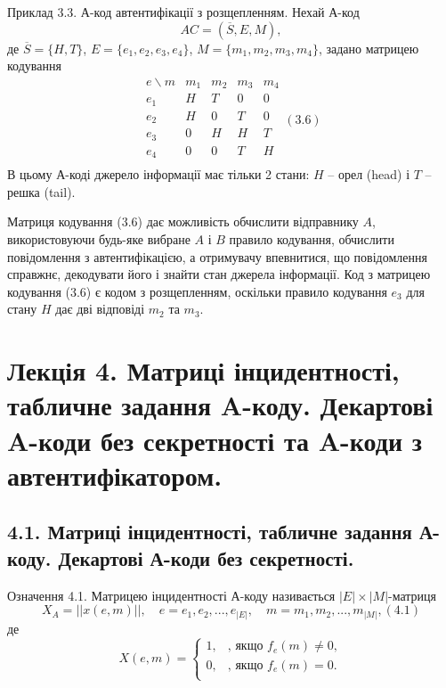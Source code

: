 \begin{example}
    Приклад 3.3. А-код автентифікації з розщепленням.
    Нехай А-код
    \begin{equation}
        AC = (\overline{S}, E, M),
    \end{equation}
    де $\overline{S} = \{H, T\}$, $E = \{e_1, e_2, e_3, e_4\}$, $M = \{m_1, m_2, m_3, m_4\}$, задано матрицею
    кодування
    \begin{equation}
        \begin{matrix}
            e\backslash m & m_1 & m_2 & m_3 & m_4 \\
            e_1 & H & T & 0 & 0 \\
            e_2 & H & 0 & T & 0 \\
            e_3 & 0 & H & H & T \\
            e_4 & 0 & 0 & T & H \\
        \end{matrix} (3.6)
    \end{equation}
    В цьому А-коді джерело інформації має тільки 2 стани:
    $H$ -- орел (head) і $T$ -- решка (tail).
    
    Матриця кодування (3.6) дає можливість обчислити відправнику $A$,
    використовуючи будь-яке вибране $A$ і $B$ правило кодування, обчислити
    повідомлення з автентифікацією, а отримувачу впевнитися, що
    повідомлення справжнє, декодувати його і знайти стан джерела інформації.
    Код з матрицею кодування (3.6) є кодом з розщепленням, оскільки правило
    кодування $e_3$ для стану $H$ дає дві відповіді $m_2$ та $m_3$.
\end{example}



\section{Лекція 4. Матриці інцидентності, табличне задання A-коду. Декартові A-коди без секретності та A-коди з автентифікатором.}

\subsection{4.1. Матриці інцидентності, табличне задання А-коду. Декартові А-коди
без секретності.}
\begin{definition}
    Означення 4.1. Матрицею інцидентності А-коду називається $|E| \times |M|$-матриця
    \begin{equation*}
    X_A = || x(e, m)||, \quad e = e_1, e_2, ..., e_{|E|},  \quad m = m_1, m_2, ..., m_{|M|}, (4.1)
    \end{equation*}
    де
    \begin{equation*}
        X(e, m) = \left\{ \begin{array}{ll}
            1, & \text{, якщо } f_e(m) \neq 0,\\
            0, & \text{, якщо } f_e(m) = 0.\\
        \end{array} \right.
    \end{equation*}
\end{definition}

